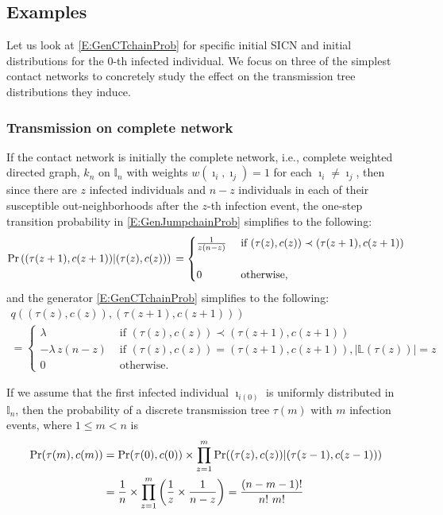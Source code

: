 \documentclass[review]{elsarticle}
\numberwithin{equation}{section}
\let\orgautoref\autoref
\renewcommand{\autoref}
        {\def\equationautorefname{Eq.}%
         \def\figureautorefname{Fig.}%
         \def\subfigureautorefname{Fig.}%
         \def\sectionautorefname{Sect.}%
         \def\subsectionautorefname{Sect.}%
         \def\subsubsectionautorefname{Sect.}%
         \def\Itemautorefname{item}%
         \def\tableautorefname{Table}%
         \def\propositionautorefname{Prop.}%
         \def\corollaryautorefname{Corollary}%
         \def\theoremautorefname{Theorem}%
         \def\remarkautorefname{Remark}%
         \def\lemmaautorefname{Lemma}%
         \def\proofofautorefname{Proof}%
         \def\exampleautorefname{Example}%
         \orgautoref}
\newcommand{\bI}{{\mathbb I}}
\newcommand{\bL}{{\mathbb L}}
\begin{document}
\subsection{Examples}\label{S:Examples}
Let us look at \autoref{E:GenCTchainProb} for specific initial SICN and initial distributions for the $0$-th infected individual.  
We focus on three of the simplest contact networks to concretely study the effect on the transmission tree distributions they induce.  

\subsubsection{Transmission on complete network}\label{EX:TrCompleteNetwork}
If the contact network is initially the complete network, i.e., complete weighted directed graph, $k_n$ on $\bI_n$ with weights $w(\imath_i,\imath_j)=1$ for each $\imath_i \neq \imath_j$, then 
since there are $z$ infected individuals and $n-z$ individuals in each of their susceptible out-neighborhoods after the $z$-th infection event, the one-step transition probability in \autoref{E:GenJumpchainProb} simplifies to the following:
\begin{equation}\label{E:GenJumpchainProbkn}
\Pr\left( (\tau(z+1),c(z+1)) | (\tau(z),c(z)) \right)\\
=
\begin{cases}
\frac{1}{z(n-z)}
& \text{ if } (\tau(z),c(z)) \prec (\tau(z+1),c(z+1))\\\\
0 & \text{ otherwise},
\end{cases}
\end{equation}
and the generator \autoref{E:GenCTchainProb} simplifies to the following:
\begin{multline}\label{E:GenCTchainProbkn}
q\left( (\tau(z),c(z)), (\tau(z+1),c(z+1)) \right)\\
=
\begin{cases}
\lambda 
& \text{ if } (\tau(z),c(z))  \prec (\tau(z+1),c(z+1))\\
-\lambda \, z(n-z) 
& \text{ if } (\tau(z),c(z)) = (\tau(z+1),c(z+1)), |\bL(\tau(z))|=z\\
0 & \text{ otherwise}.
\end{cases}
\end{multline}

If we assume that the first infected individual $\imath_{i(0)}$ is uniformly distributed in $\bI_n$, then
the probability of a discrete transmission tree $\tau(m)$ with $m$ infection events, where $1\leq m < n$ is
\begin{align}\label{E:GenCTchainProbknTree}
\Pr(\tau(m),c(m)) 
&= \Pr(\tau(0),c(0)) \times \prod_{z=1}^m \Pr((\tau(z),c(z)) | (\tau(z-1),c(z-1)) ) \notag\\
&= \frac{1}{n} \times \prod_{z=1}^{m} \left( \frac{1}{z} \times \frac{1}{n-z}\right) = \frac{(n-m-1)!}{n! \ m!}
\end{align}
\end{document}
